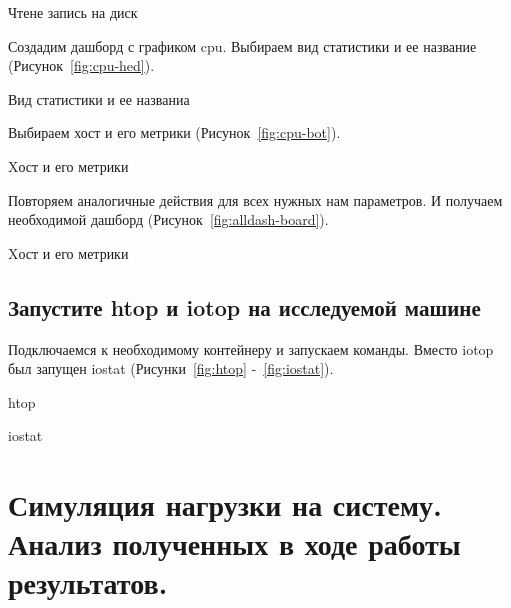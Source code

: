 \begin{image}
    \caption{Чтене запись на диск}
    \label{fig:write-conf}
\end{image}

\clearpage

Создадим дашборд с графиком cpu.
Выбираем вид статистики и ее название (Рисунок~\ref{fig:cpu-hed}).

\begin{image}
    \caption{Вид статистики и ее названиа}
    \label{fig:cpu-hed}
\end{image}

Выбираем хост и его метрики (Рисунок~\ref{fig:cpu-bot}).

\begin{image}
    \caption{Xост и его метрики}
    \label{fig:cpu-bot}
\end{image}

Повторяем аналогичные действия для всех нужных нам параметров.
И получаем необходимой дашборд (Рисунок~\ref{fig:alldash-board}).

\begin{image}
    \caption{Xост и его метрики}
    \label{fig:alldash-board}
\end{image}

\clearpage

\subsection{Запустите htop и iotop на исследуемой машине}

Подключаемся к необходимому контейнеру и запускаем команды.
Вместо iotop был запущен iostat (Рисунки~\ref{fig:htop} -~\ref{fig:iostat}).

\begin{image}
    \caption{htop}
    \label{fig:htop}
\end{image}

\begin{image}
    \caption{iostat}
    \label{fig:iostat}
\end{image}

\clearpage

\section{Симуляция нагрузки на систему. Анализ полученных в ходе работы
результатов.}
